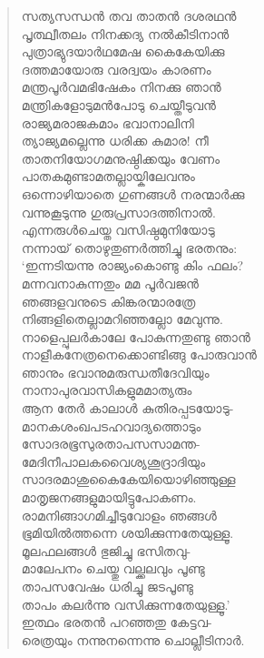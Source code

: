 \begin{verse}
സത്യസന്ധന്‍ തവ താതന്‍ ദശരഥന്‍\\
പൃത്ഥ്വീതലം നിനക്കദ്യ നല്‍കീടിനാന്‍\\
പുത്രാഭ്യുദയാര്‍ഥമേഷ കൈകേയിക്കു\\
ദത്തമായോരു വരദ്വയം കാരണം\\
മന്ത്രപൂര്‍വമഭിഷേകം നിനക്കു ഞാന്‍\\
മന്ത്രികളോടുമന്‍പോടു ചെയ്തീടുവന്‍\\
രാജ്യമരാജകമാം ഭവാനാലിനി\\
ത്യാജ്യമല്ലെന്നു ധരിക്ക കുമാര! നീ\\
താതനിയോഗമനുഷ്ഠിക്കയും വേണം\\
പാതകമുണ്ടാമതല്ലായ്കിലേവനും\\
ഒന്നൊഴിയാതെ ഗുണങ്ങള്‍ നരന്മാര്‍ക്കു\\
വന്നുകൂടുന്നു ഗുരുപ്രസാദത്തിനാല്‍.\\
എന്നരുള്‍ചെയ്ത വസിഷ്ഠമുനിയോടു\\
നന്നായ് തൊഴുതുണര്‍ത്തിച്ചു ഭരതനും:\\
‘ഇന്നടിയന്നു രാജ്യംകൊണ്ടു കിം ഫലം?\\
മന്നവനാകുന്നതും മമ പൂര്‍വജന്‍\\
ഞങ്ങളവനുടെ കിങ്കരന്മാരത്രേ\\
നിങ്ങളിതെല്ലാമറിഞ്ഞല്ലോ മേവുന്നു.\\
നാളെപ്പുലര്‍കാലേ പോകുന്നതുണ്ടു ഞാന്‍\\
നാളീകനേത്രനെക്കൊണ്ടിങ്ങു പോരുവാന്‍\\
ഞാനും ഭവാനുമരുന്ധതീദേവിയും\\
നാനാപുരവാസികളുമമാത്യരും\\
ആന തേര്‍ കാലാള്‍ കുതിരപ്പടയോടു-\\
മാനകശംഖപടഹവാദ്യത്തൊടും\\
സോദരഭൂസുരതാപസസാമന്ത-\\
മേദിനീപാലകവൈശ്യശൂദ്രാദിയും\\
സാദരമാശുകൈകേയിയൊഴിഞ്ഞുള്ള\\
മാതൃജനങ്ങളുമായിട്ടുപോകണം.\\
രാമനിങ്ങാഗമിച്ചീടുവോളം ഞങ്ങള്‍\\
ഭൂമിയില്‍ത്തന്നെ ശയിക്കുന്നതേയുള്ളൂ.\\
മൂലഫലങ്ങള്‍ ഭുജിച്ചു ഭസിതവു-\\
മാലേപനം ചെയ്തു വല്ക്കലവും പൂണ്ടു\\
താപസവേഷം ധരിച്ചു ജടപൂണ്ടു\\
താപം കലര്‍ന്നു വസിക്കുന്നതേയുള്ളൂ.’\\
ഇത്ഥം ഭരതന്‍ പറഞ്ഞതു കേട്ടവ-\\
രെത്രയും നന്നുനന്നെന്നു ചൊല്ലീടിനാര്‍.
\end{verse}
\bigskip

